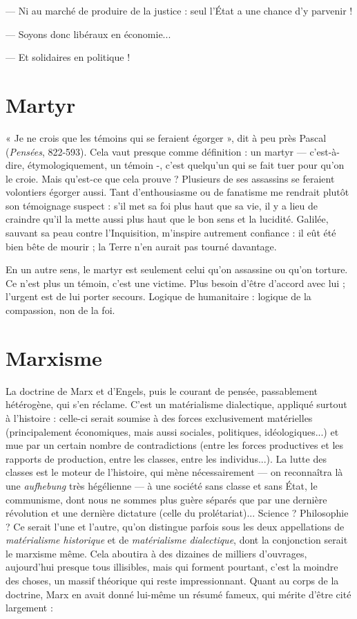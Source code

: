 — Ni au marché de produire de la justice : seul l’État a une chance d'y
parvenir !

— Soyons donc libéraux en économie...

— Et solidaires en politique !

\section{Martyr}
« Je ne crois que les témoins qui se feraient égorger », dit à peu
près Pascal ({\it Pensées}, 822-593). Cela vaut presque comme définition :
un martyr — c’est-à-dire, étymologiquement, un témoin -, c’est
quelqu’un qui se fait tuer pour qu’on le croie. Mais qu'est-ce que cela prouve ?
Plusieurs de ses assassins se feraient volontiers égorger aussi. Tant d’enthousiasme
ou de fanatisme me rendrait plutôt son témoignage suspect : s’il met sa
foi plus haut que sa vie, il y a lieu de craindre qu’il la mette aussi plus haut que
le bon sens et la lucidité. Galilée, sauvant sa peau contre l’Inquisition, m’inspire
autrement confiance : il eût été bien bête de mourir ; la Terre n’en aurait
pas tourné davantage.

En un autre sens, le martyr est seulement celui qu’on assassine ou qu’on
torture. Ce n’est plus un témoin, c’est une victime. Plus besoin d’être d’accord
avec lui ; l’urgent est de lui porter secours. Logique de humanitaire : logique
de la compassion, non de la foi.

\section{Marxisme}
La doctrine de Marx et d’Engels, puis le courant de pensée,
passablement hétérogène, qui s’en réclame. C’est un matérialisme
dialectique, appliqué surtout à l’histoire : celle-ci serait soumise à des
forces exclusivement matérielles (principalement économiques, mais aussi
sociales, politiques, idéologiques...) et mue par un certain nombre de contradictions
(entre les forces productives et les rapports de production, entre les
classes, entre les individus...). La lutte des classes est le moteur de l’histoire, qui
mène nécessairement — on reconnaîtra là une {\it aufhebung} très hégélienne — à une
société sans classe et sans État, le communisme, dont nous ne sommes plus
guère séparés que par une dernière révolution et une dernière dictature (celle
du prolétariat)... Science ? Philosophie ? Ce serait l’une et l’autre, qu’on distingue
parfois sous les deux appellations de {\it matérialisme historique} et de {\it matérialisme
dialectique}, dont la conjonction serait le marxisme même. Cela aboutira
à des dizaines de milliers d'ouvrages, aujourd’hui presque tous illisibles,
mais qui forment pourtant, c’est la moindre des choses, un massif théorique
qui reste impressionnant. Quant au corps de la doctrine, Marx en avait donné
lui-même un résumé fameux, qui mérite d’être cité largement :


